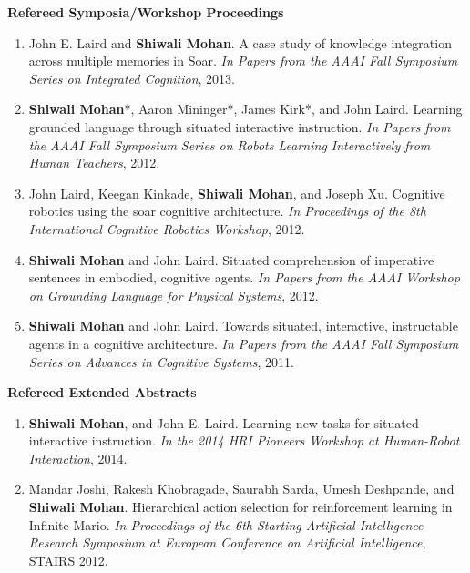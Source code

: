 \documentclass[margin,line,11pt]{res}
\begin{document}
\begin{resume}
                  \textbf{Refereed Symposia/Workshop Proceedings}
                  \begin{enumerate}[label=\lbrack W\arabic*\rbrack:,leftmargin=*]
                  \item John E. Laird and \textbf{Shiwali Mohan}. A case study of knowledge integration across multiple memories in
                    Soar. \emph{In Papers from the AAAI Fall Symposium Series on Integrated Cognition}, 2013.
                  \item \textbf{Shiwali Mohan}*, Aaron Mininger*, James Kirk*, and John Laird. Learning grounded language through
                    situated interactive instruction. \emph{In Papers from the AAAI Fall Symposium Series on Robots Learning Interactively from Human Teachers}, 2012.
                  \item John Laird, Keegan Kinkade, \textbf{Shiwali Mohan}, and Joseph Xu. Cognitive robotics using the soar cognitive
                    architecture. \emph{In Proceedings of the 8th International Cognitive Robotics Workshop}, 2012.
                  \item \textbf{Shiwali Mohan} and John Laird. Situated comprehension of imperative sentences in embodied, cognitive
                    agents. \emph{In Papers from the AAAI Workshop on Grounding Language for Physical Systems}, 2012.
                  \item \textbf{Shiwali Mohan} and John Laird. Towards situated, interactive, instructable agents in a cognitive architecture. \emph{In Papers from the AAAI Fall Symposium Series on Advances in Cognitive Systems}, 2011.
                  \end{enumerate}


                  \textbf{Refereed Extended Abstracts}
                  \begin{enumerate}[label=\lbrack A\arabic*\rbrack,leftmargin=*]
                  \item \textbf{Shiwali Mohan}, and John E. Laird. Learning new tasks for situated interactive instruction. \emph{In the 2014 HRI Pioneers Workshop at Human-Robot Interaction}, 2014.

                  \item Mandar Joshi, Rakesh Khobragade, Saurabh Sarda, Umesh Deshpande, and \textbf{Shiwali Mohan}. Hierarchical
                    action selection for reinforcement learning in Infinite Mario. \emph{In Proceedings of the 6th Starting Artificial
                      Intelligence Research Symposium at European Conference on Artificial Intelligence}, STAIRS 2012.


\end{enumerate}
\end{resume}
\end{document}

